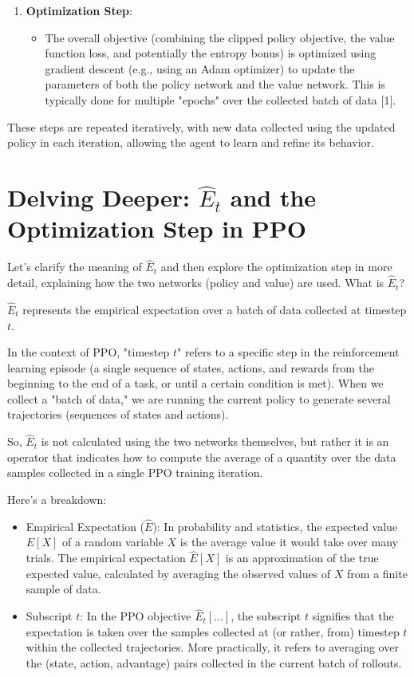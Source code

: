 \documentclass[10pt,a4paper]{report}
\begin{document}
\begin{enumerate}
\item    \textbf{Optimization Step}:
\begin{itemize}
\item         The overall objective (combining the clipped policy objective, the value function loss, and potentially the entropy bonus) is optimized using gradient descent (e.g., using an Adam optimizer) to update the parameters of both the policy network and the value network. This is typically done for multiple "epochs" over the collected batch of data [1].
\end{itemize}
\end{enumerate}
These steps are repeated iteratively, with new data collected using the updated policy in each iteration, allowing the agent to learn and refine its behavior.

\section{Delving Deeper: $\hat{E}_t$ and the Optimization Step in PPO}

Let's clarify the meaning of $\hat{E}_t$ and then explore the optimization step in more detail, explaining how the two networks (policy and value) are used.
What is $\hat{E}_t$?

$\hat{E}_t$ represents the empirical expectation over a batch of data collected at timestep $t$.

In the context of PPO, "timestep $t$" refers to a specific step in the reinforcement learning episode (a single sequence of states, actions, and rewards from the beginning to the end of a task, or until a certain condition is met). When we collect a "batch of data," we are running the current policy to generate several trajectories (sequences of states and actions).

So, $\hat{E}_t$ is not calculated using the two networks themselves, but rather it is an operator that indicates how to compute the average of a quantity over the data samples collected in a single PPO training iteration.

Here's a breakdown:
\begin{itemize}
\item    Empirical Expectation ($\hat{E}$): In probability and statistics, the expected value $E[X]$ of a random variable $X$ is the average value it would take over many trials. The empirical expectation $\hat{E}[X]$ is an approximation of the true expected value, calculated by averaging the observed values of $X$ from a finite sample of data.
\item    Subscript $t$: In the PPO objective $\hat{E}_t [\dots]$, the subscript $t$ signifies that the expectation is taken over the samples collected at (or rather, from) timestep $t$ within the collected trajectories. More practically, it refers to averaging over the (state, action, advantage) pairs collected in the current batch of rollouts.
\end{itemize}
\end{document}
